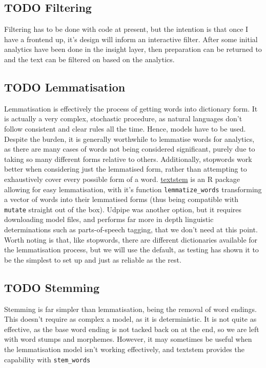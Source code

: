 \documentclass[a4paper, 11pt]{article}
\begin{document}
\subsection{{\bfseries\sffamily TODO} Filtering}
\label{sec:org5e71056}
Filtering has to be done with code at present, but the intention is
that once I have a frontend up, it's design will inform an interactive
filter. After some initial analytics have been done in the insight
layer, then preparation can be returned to and the text can be
filtered on based on the analytics.
\subsection{{\bfseries\sffamily TODO} Lemmatisation}
\label{sec:org18454a0}
Lemmatisation is effectively the process of getting words into
dictionary form. It is actually a very complex, stochastic procedure,
as natural languages don't follow consistent and clear rules all the
time. Hence, models have to be used. Despite the burden, it is
generally worthwhile to lemmatise words for analytics, as there are
many cases of words not being considered significant, purely due to
taking so many different forms relative to others. Additionally,
stopwords work better when considering just the lemmatised form,
rather than attempting to exhaustively cover every possible form of a
word. \href{https://github.com/trinker/textstem/}{textstem} is an R package allowing for easy lemmatisation, with
it's function \texttt{lemmatize\_words} transforming a vector of words into
their lemmatised forms (thus being compatible with \texttt{mutate} straight
out of the box). Udpipe was another option, but it requires
downloading model files, and performs far more in depth linguistic
determinations such as parts-of-speech tagging, that we don't need at
this point. Worth noting is that, like stopwords, there are different
dictionaries available for the lemmatisation process, but we will use
the default, as testing has shown it to be the simplest to set up and
just as reliable as the rest.
\subsection{{\bfseries\sffamily TODO} Stemming}
\label{sec:org95aaea5}
Stemming is far simpler than lemmatisation, being the removal of word
endings. This doesn't require as complex a model, as it is
deterministic. It is not quite as effective, as the base word ending
is not tacked back on at the end, so we are left with word stumps and
morphemes. However, it may sometimes be useful when the lemmatisation
model isn't working effectively, and textstem provides the capability
with \texttt{stem\_words}
\end{document}
